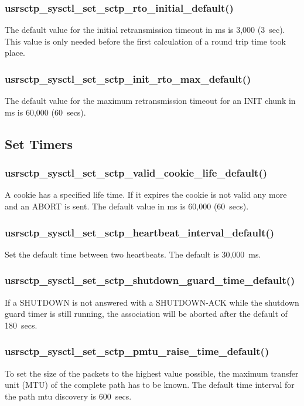 \documentclass[a4paper]{article}
\begin{document}
\subsubsection{usrsctp\_sysctl\_set\_sctp\_rto\_initial\_default()}
The default value for the initial retransmission timeout in ms is 3,000 (3~sec). This value is only
needed before the first calculation of a round trip time took place.

\subsubsection{usrsctp\_sysctl\_set\_sctp\_init\_rto\_max\_default()}
The default value for the maximum retransmission timeout for an INIT chunk in ms is 60,000 (60~secs). 


\subsection{Set Timers}
\subsubsection{usrsctp\_sysctl\_set\_sctp\_valid\_cookie\_life\_default()}
A cookie has a specified life time. If it expires the cookie is not valid any more and an ABORT is sent.
The default value in ms is 60,000 (60~secs).

\subsubsection{usrsctp\_sysctl\_set\_sctp\_heartbeat\_interval\_default()}
Set the default time between two heartbeats. The default is 30,000~ms.

\subsubsection{usrsctp\_sysctl\_set\_sctp\_shutdown\_guard\_time\_default()}
If a SHUTDOWN is not answered with a SHUTDOWN-ACK while the shutdown guard timer is still
running, the association will be aborted after the default of 180~secs.

\subsubsection{usrsctp\_sysctl\_set\_sctp\_pmtu\_raise\_time\_default()}
To set the size of the packets to the highest value possible, the maximum transfer unit (MTU)
of the complete path has to be known. The default time interval for the path mtu discovery
is 600~secs.
\end{document}
